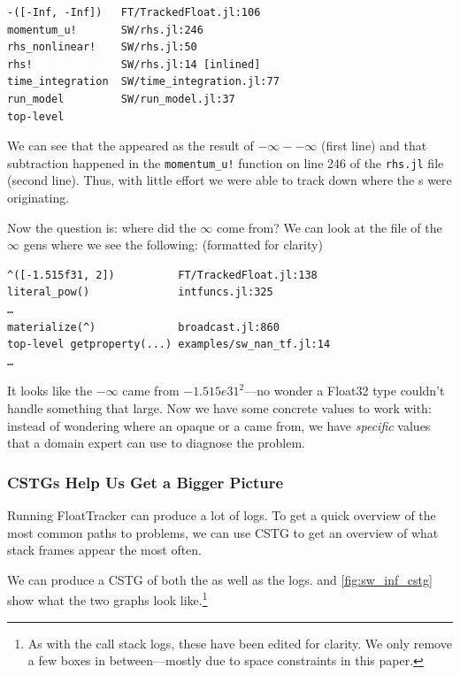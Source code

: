 \documentclass{juliacon}
\begin{document}
\begin{verbatim}
-([-Inf, -Inf])   FT/TrackedFloat.jl:106
momentum_u!       SW/rhs.jl:246
rhs_nonlinear!    SW/rhs.jl:50
rhs!              SW/rhs.jl:14 [inlined]
time_integration  SW/time_integration.jl:77
run_model         SW/run_model.jl:37
top-level
\end{verbatim}

We can see that the \NaN{} appeared as the result of $-\infty - -\infty$ (first line) and that subtraction happened in the \texttt{momentum\_u!} function on line 246 of the \texttt{rhs.jl} file (second line).
Thus, with little effort we were able to track down where the \NaN{}s were originating.

Now the question is: where did the $\infty$ come from?
We can look at the file of the $\infty$ gens where we see the following: (formatted for clarity)

\begin{verbatim}
^([-1.515f31, 2])          FT/TrackedFloat.jl:138
literal_pow()              intfuncs.jl:325
…
materialize(^)             broadcast.jl:860
top-level getproperty(...) examples/sw_nan_tf.jl:14
…
\end{verbatim}

It looks like the $-\infty$ came from $-1.515e31^2$---no wonder a Float32 type couldn't handle something that large.
Now we have some concrete values to work with: instead of wondering where an opaque \Inf{} or a \NaN{} came from, we have \emph{specific} values that a domain expert can use to diagnose the problem.

\subsubsection{CSTGs Help Us Get a Bigger Picture}

Running FloatTracker can produce a lot of logs.
To get a quick overview of the most common paths to problems, we can use CSTG to get an overview of what stack frames appear the most often.

We can produce a CSTG of both the \Inf{} as well as the \NaN{} logs.
 and \cref{fig:sw_inf_cstg} show what the two graphs look like.\footnote{As with the call stack logs, these have been edited for clarity. We only remove a few boxes in between—mostly due to space constraints in this paper.}
\end{document}
